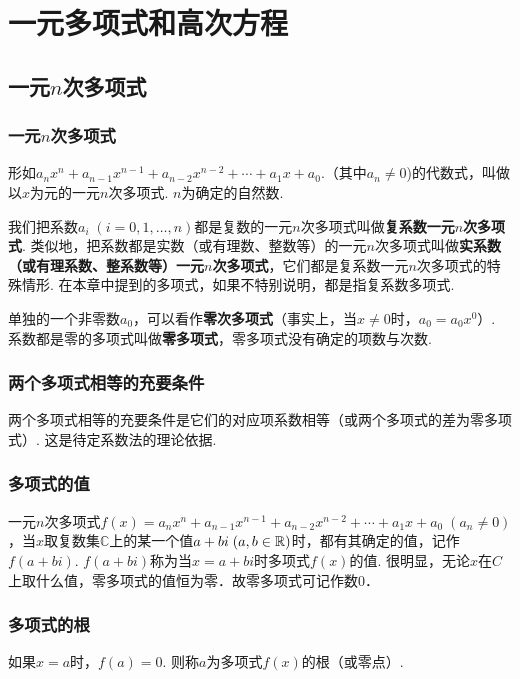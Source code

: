 \chapter{一元多项式和高次方程}

\section{一元$n$次多项式}

\subsection{一元$n$次多项式}

形如$a_nx^n+a_{n-1}x^{n-1}+a_{n-2}x^{n-2}+\cdots+a_1x+a_0$.（其中$a_n\ne 0$)的代数式，叫做以$x$为元的一元$n$次多项式. $n$为确定的自然数.

我们把系数$a_i\; (i=0,1,\ldots,n)$都是复数的一元$n$次多项式叫做\textbf{复系数一元$n$次多项式}. 类似地，把系数都是实数（或有理数、整数等）的一元$n$次多项式叫做\textbf{实系数（或有理系数、整系数等）一元$n$次多项式}，它们都是复系数一元$n$次多项式的特殊情形. 在本章中提到的多项式，如果不特别说明，都是指复系数多项式.

单独的一个非零数$a_0$，可以看作\textbf{零次多项式}（事实上，当$x\ne 0$时，$a_0=a_0x^0$）. 系数都是零的多项式叫做\textbf{零多项式}，零多项式没有确定的项数与次数.

\subsection{两个多项式相等的充要条件}

两个多项式相等的充要条件是它们的对应项系数相等（或两个多项式的差为零多项式）. 这是待定系数法的理论依据.

\subsection{多项式的值}
一元$n$次多项式$f(x)=a_nx^n+a_{n-1}x^{n-1}+a_{n-2}x^{n-2}+\cdots+a_1x+a_0\; (a_n\ne 0)$，当$x$取复数集$\mathbb{C}$上的某一个值$a+bi\; (a,b\in\mathbb{R})$时，都有其确定的值，记作$f(a+bi)$. $f(a+bi)$称为当$x=a+bi$时多项式$f(x)$的值. 很明显，无论$x$在$C$上取什么值，零多项式的值恒为零．故零多项式可记作数0．

\subsection{多项式的根}
如果$x=a$时，$f(a)=0$. 则称$a$为多项式$f(x)$的根（或零点）.

